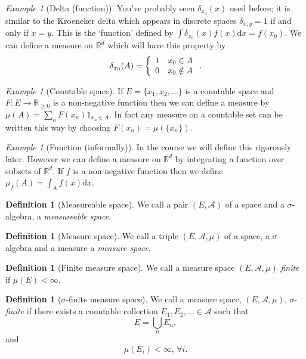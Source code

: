 \documentclass[11pt]{article}
\theoremstyle{definition}
\newtheorem{dfn}[thm]{Definition}
\theoremstyle{remark}
\newtheorem{ex}[thm]{Example}
\begin{document}
\begin{ex}[Delta (function)]
You've probably seen $\delta_{x_0}(x)$ used before; it is similar to the Kroeneker delta which appears in discrete spaces $\delta_{x,y} = 1$ if and only if $x=y$. This is the `function' defined by $\int \delta_{x_0}(x)f(x) \mathrm{d}x = f(x_0)$.  We can define a measure on $\mathbb{R}^d$ which will have this property by \[\delta_{x_0}(A) = \left\{ \begin{array}{l l} 1 & x_0 \in A \\ 0 & x_0 \notin A \end{array} \right. .\]
\end{ex}

\begin{ex}[Countable space]
If $E = \{ x_1, x_2, \dots\}$ is a countable space and $F: E \rightarrow \mathbb{R}_{\geq 0}$ is a non-negative function then we can define a measure by $\mu(A) = \sum_n F(x_n)1_{x_n \in A}$. In fact any measure on a countable set can be written this way by choosing $F(x_n) = \mu(\{x_n\})$.
\end{ex}

\begin{ex}[Function (informally)]
In the course we will define this rigorously later. However we can define a measure on $\mathbb{R}^d$ by integrating a function over subsets of $\mathbb{R}^d$. If $f$ is a non-negative function then we define $\mu_f(A) = \int_A f(x) \mathrm{d}x$.
\end{ex}

\begin{dfn}[Measureable space]
We call a pair $(E, \mathcal{A})$ of a space and a $\sigma$-algebra, a \emph{measureable space}.
\end{dfn}

\begin{dfn}[Measure space]
We call a triple $(E, \mathcal{A}, \mu)$ of a space, a $\sigma$-algebra and a measure a \emph{measure space}.
\end{dfn}

\begin{dfn}[Finite measure space]
We call a measure space $(E, \mathcal{A}, \mu)$ \emph{finite} if $\mu(E) < \infty$.
\end{dfn}

\begin{dfn}[$\sigma$-finite measure space]
We call a measure space, $(E, \mathcal{A}, \mu)$, $\sigma$-\emph{finite} if there exists a countable collection $E_1, E_2, \dots \in \mathcal{A}$ such that
\[ E = \bigcup_n E_n, \] and
\[ \mu(E_i) < \infty, \, \forall i. \]
\end{dfn}
\end{document}
